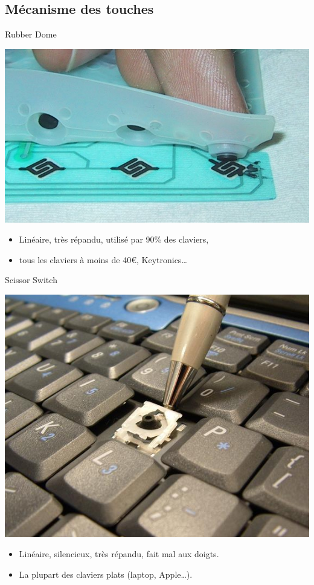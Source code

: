 \subsection{Mécanisme des touches}
\begin{frame}{Rubber Dome}
	\begin{center}
		\includegraphics[scale=0.4]{images/hard_rubberdome}
	\end{center}
	\begin{itemize}
		\item Linéaire, très répandu, utilisé par 90\% des claviers,
		\item tous les claviers à moins de 40€, Keytronics\dots
	\end{itemize}
\end{frame}

\begin{frame}{Scissor Switch}
	\begin{center}
		\includegraphics[scale=0.3]{images/hard_scissor}
	\end{center}
	\begin{itemize}
		\item Linéaire, silencieux, très répandu, fait mal aux doigts.
		\item La plupart des claviers plats (laptop, Apple\dots).
	\end{itemize}
\end{frame}

